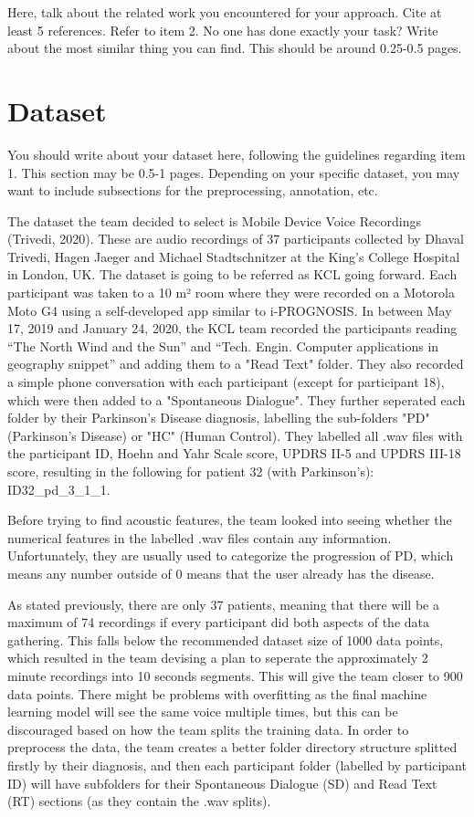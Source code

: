 \documentclass[11pt]{article}
\begin{document}
Here, talk about the related work you encountered for your approach. Cite at least 5 references. Refer to item 2. No one has done exactly your task? Write about the most similar thing you can find. This should be around 0.25-0.5 pages.

\section{Dataset}

You should write about your dataset here, following the guidelines regarding item 1. This section may be 0.5-1 pages. Depending on your specific dataset, you may want to include subsections for the preprocessing, annotation, etc.

The dataset the team decided to select is Mobile Device Voice Recordings (Trivedi, 2020). These are audio recordings of
37 participants collected by Dhaval Trivedi, Hagen Jaeger and Michael Stadtschnitzer at the King's College Hospital in 
London, UK. The dataset is going to be referred as KCL going forward. Each participant was taken to a 10 m² room where
they were recorded on a Motorola Moto G4 using a self-developed app similar to i-PROGNOSIS. In between May 17, 2019 and January 24, 2020,
the KCL team recorded the participants reading “The North Wind and the Sun” and “Tech. Engin. Computer applications in geography snippet”
and adding them to a "Read Text" folder. They also recorded a simple phone conversation with each participant (except for participant 18),
which were then added to a "Spontaneous Dialogue". They further seperated each folder by their Parkinson's Disease
diagnosis, labelling the sub-folders "PD" (Parkinson's Disease) or "HC" (Human Control). They labelled all .wav files 
with the participant ID, Hoehn and Yahr Scale score, UPDRS II-5 and UPDRS III-18 score, resulting in the following for 
patient 32 (with Parkinson's): ID32\_pd\_3\_1\_1. 

Before trying to find acoustic features, the team looked into seeing whether the numerical features in the labelled .wav files
contain any information. Unfortunately, they are usually used to categorize the progression of PD, which means any number
outside of 0 means that the user already has the disease. 

As stated previously, there are only 37 patients, meaning that there will be a maximum of 74 recordings if every participant
did both aspects of the data gathering. This falls below the recommended dataset size of 1000 data points, which resulted
in the team devising a plan to seperate the approximately 2 minute recordings into 10 seconds segments. This will give 
the team closer to 900 data points. There might be problems with overfitting as the final machine learning model will see
the same voice multiple times, but this can be discouraged based on how the team splits the training data. In order to
preprocess the data, the team creates a better folder directory structure splitted firstly by their diagnosis, and then 
each participant folder (labelled by participant ID) will have subfolders for their Spontaneous Dialogue (SD) and 
Read Text (RT) sections (as they contain the .wav splits). 
\end{document}
